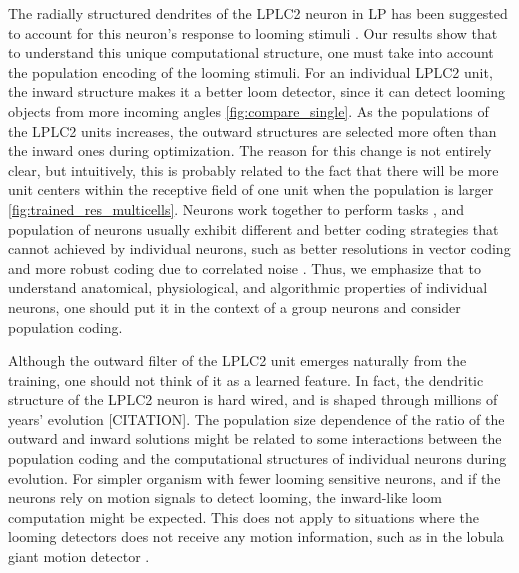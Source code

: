 \documentclass[pdftex,9pt,lineno]{elife}
\begin{document}


The radially structured dendrites of the LPLC2 neuron in LP has been suggested to account for this neuron's response to looming stimuli \citep{klapoetke2017ultra}. Our results show that to understand this unique computational structure, one must take into account the population encoding of the looming stimuli. For an individual LPLC2 unit, the inward structure makes it a better loom detector, since it can detect looming objects from more incoming angles \ref{fig:compare_single}. As the populations of the LPLC2 units increases, the outward structures are selected more often than the inward ones during optimization. The reason for this change is not entirely clear, but intuitively, this is probably related to the fact that there will be more unit centers within the receptive field of one unit when the population is larger \ref{fig:trained_res_multicells}. Neurons work together to perform tasks \citep{pasupathy2002population}, and population of neurons usually exhibit different and better coding strategies that cannot achieved by individual neurons, such as better resolutions in vector coding \citep{georgopoulos1986neuronal,vogels1990population} and more robust coding due to correlated noise \citep{franke2016structures,zylberberg2016direction,cafaro2020global}. Thus, we emphasize that to understand anatomical, physiological, and algorithmic properties of individual neurons, one should put it in the context of a group neurons and consider population coding.

Although the outward filter of the LPLC2 unit emerges naturally from the training, one should not think of it as a learned feature. In fact, the dendritic structure of the LPLC2 neuron is hard wired, and is shaped through millions of years' evolution [CITATION]. The population size dependence of the ratio of the outward and inward solutions might be related to some interactions between the population coding and the computational structures of individual neurons during evolution. For simpler organism with fewer looming sensitive neurons, and if the neurons rely on motion signals to detect looming, the inward-like loom computation might be expected. This does not apply to situations where the looming detectors does not receive any motion information, such as in the lobula giant motion detector \citep{rind1996neural}.
\end{document}
